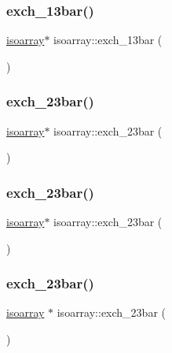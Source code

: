 \subsubsection{\texorpdfstring{exch\_13bar()}{exch\_13bar()}\hspace{0.1cm}{\footnotesize\ttfamily [3/3]}}
{\footnotesize\ttfamily \mbox{\hyperlink{classisoarray}{isoarray}}$\ast$ isoarray\+::exch\+\_\+13bar (\begin{DoxyParamCaption}{ }\end{DoxyParamCaption})}

\mbox{\label{classisoarray_a9dd30b80f22c1bbc17633283f0056e69}} 
\subsubsection{\texorpdfstring{exch\_23bar()}{exch\_23bar()}\hspace{0.1cm}{\footnotesize\ttfamily [1/3]}}
{\footnotesize\ttfamily \mbox{\hyperlink{classisoarray}{isoarray}}$\ast$ isoarray\+::exch\+\_\+23bar (\begin{DoxyParamCaption}{ }\end{DoxyParamCaption})}

\mbox{\label{classisoarray_a9dd30b80f22c1bbc17633283f0056e69}} 
\subsubsection{\texorpdfstring{exch\_23bar()}{exch\_23bar()}\hspace{0.1cm}{\footnotesize\ttfamily [2/3]}}
{\footnotesize\ttfamily \mbox{\hyperlink{classisoarray}{isoarray}}$\ast$ isoarray\+::exch\+\_\+23bar (\begin{DoxyParamCaption}{ }\end{DoxyParamCaption})}

\mbox{\label{classisoarray_ac6b8d6c435627c589a5bfa9edfa7408d}} 
\subsubsection{\texorpdfstring{exch\_23bar()}{exch\_23bar()}\hspace{0.1cm}{\footnotesize\ttfamily [3/3]}}
{\footnotesize\ttfamily \mbox{\hyperlink{classisoarray}{isoarray}} $\ast$ isoarray\+::exch\+\_\+23bar (\begin{DoxyParamCaption}{ }\end{DoxyParamCaption})}

